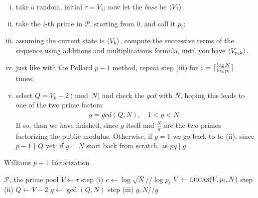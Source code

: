 \begin{enumerate}[(i)]
\item take a random, initial $\tau = V_1$; now let the \emph{base} be
  $\langle V_1\rangle$.
\item take the $i$-th prime in $\mathcal{P}$, starting from $0$, and call it
  $p_i$;
\item assuming the current state is $\langle V_k\rangle$, compute the
  successive terms of the sequence using additions and multiplications formula,
  until you have $\langle V_{p_ik}\rangle$.
\item just like with the Pollard $p-1$ method, repeat step (iii) for $e =
  \lceil\frac{\log N}{\log p_i}\rceil$ times;
\item select $Q = V_k - 2 \pmod{N}$ and check the $gcd$ with $N$, hoping this
  leads to one of the two prime factors:
\begin{align}
  g = gcd(Q, N), \quad 1 < g < N \,.
\end{align}
If so, than we have finished, since $g$ itself and $\frac{N}{g}$
are the two primes factorizing the public  modulus.
Otherwise, if $g = 1$ we go back to to (ii), since $p-1 \nmid Q$ yet;
if $g = N$ start back from scratch, as $pq \mid g$.

\end{enumerate}



\begin{algorithm}
  \caption{Williams $p+1$ factorization}
  \begin{algorithmic}[1]
    \Require $\mathcal{P}$, the prime pool
      \State $V \gets \tau$
      \Comment step (i)
        \State $e \gets \log \sqrt{N} // \log p_i$
          \State $V \gets \textsc{lucas}(V, p_i, N)$
          \Comment step (ii)
          \State $Q \gets V -2$
          \State $g \gets \gcd(Q, N)$
          \Comment step (iii)
           \Return {}
           \Return $g, N//g$
          \EndIf
        \EndFor
      \EndFor
    \EndFunction
  \end{algorithmic}
\end{algorithm}
